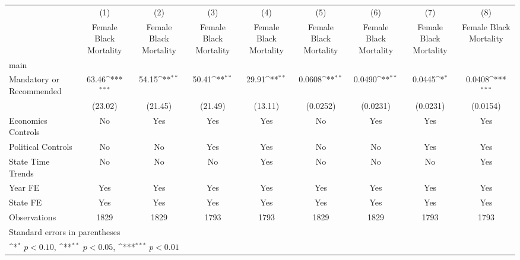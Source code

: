 {
\def\sym#1{\ifmmode^{#1}\else\(^{#1}\)\fi}
\begin{longtable}{l*{8}{c}}
\hline\hline\endfirsthead\hline\endhead\hline\endfoot\endlastfoot
                    &\multicolumn{1}{c}{(1)}&\multicolumn{1}{c}{(2)}&\multicolumn{1}{c}{(3)}&\multicolumn{1}{c}{(4)}&\multicolumn{1}{c}{(5)}&\multicolumn{1}{c}{(6)}&\multicolumn{1}{c}{(7)}&\multicolumn{1}{c}{(8)}\\
                    &\multicolumn{1}{c}{Female Black Mortality}&\multicolumn{1}{c}{Female Black Mortality}&\multicolumn{1}{c}{Female Black Mortality}&\multicolumn{1}{c}{Female Black Mortality}&\multicolumn{1}{c}{Female Black Mortality}&\multicolumn{1}{c}{Female Black Mortality}&\multicolumn{1}{c}{Female Black Mortality}&\multicolumn{1}{c}{Female Black Mortality}\\
\hline
main                &                     &                     &                     &                     &                     &                     &                     &                     \\
Mandatory or Recommended&       63.46\sym{***}&       54.15\sym{**} &       50.41\sym{**} &       29.91\sym{**} &      0.0608\sym{**} &      0.0490\sym{**} &      0.0445\sym{*}  &      0.0408\sym{***}\\
                    &     (23.02)         &     (21.45)         &     (21.49)         &     (13.11)         &    (0.0252)         &    (0.0231)         &    (0.0231)         &    (0.0154)         \\
[1em]
Economics Controls  &          No         &         Yes         &         Yes         &         Yes         &          No         &         Yes         &         Yes         &         Yes         \\
[1em]
Political Controls  &          No         &          No         &         Yes         &         Yes         &          No         &          No         &         Yes         &         Yes         \\
[1em]
State Time Trends   &          No         &          No         &          No         &         Yes         &          No         &          No         &          No         &         Yes         \\
[1em]
Year FE             &         Yes         &         Yes         &         Yes         &         Yes         &         Yes         &         Yes         &         Yes         &         Yes         \\
[1em]
State FE            &         Yes         &         Yes         &         Yes         &         Yes         &         Yes         &         Yes         &         Yes         &         Yes         \\
\hline
Observations        &        1829         &        1829         &        1793         &        1793         &        1829         &        1829         &        1793         &        1793         \\
\hline\hline
\multicolumn{9}{l}{\footnotesize Standard errors in parentheses}\\
\multicolumn{9}{l}{\footnotesize \sym{*} \(p<0.10\), \sym{**} \(p<0.05\), \sym{***} \(p<0.01\)}\\
\end{longtable}
}
